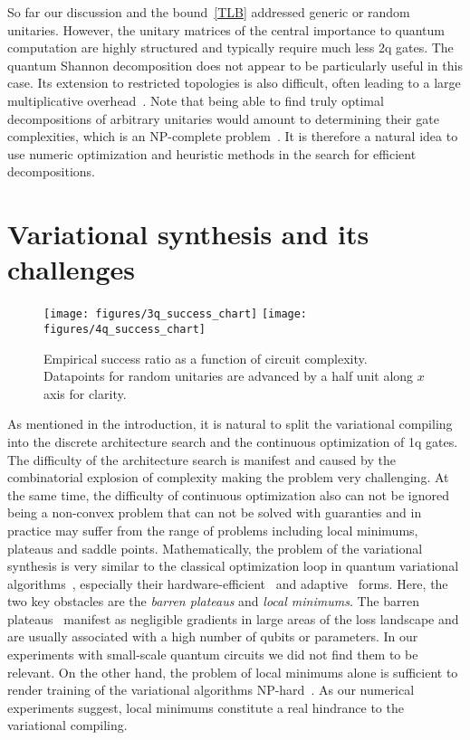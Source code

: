 \documentclass[draft, twocolumn, amsfonts, amssymb, aps, nofootinbib]{revtex4-2}
\begin{document}
So far our discussion and the bound~\eqref{TLB} addressed generic or random unitaries. However, the unitary matrices of the central importance to quantum computation are highly structured and typically require much less 2q gates. The quantum Shannon decomposition does not appear to be particularly useful in this case. Its extension to restricted topologies is also difficult, often leading to a large multiplicative overhead~\cite{Shende2006}. Note that being able to find truly optimal decompositions of arbitrary unitaries would amount to determining their gate complexities, which is an NP-complete problem~\cite{Botea2018}. It is therefore a natural idea to use numeric optimization and heuristic methods in the search for efficient decompositions.

\section{Variational synthesis and its challenges \label{sec local minimums}}

\begin{figure*}
	\texttt{[image: figures/3q\_success\_chart]}
	\texttt{[image: figures/4q\_success\_chart]}
	\caption{Empirical success ratio as a function of circuit complexity. Datapoints for random unitaries are advanced by a half unit along $x$ axis for clarity.}
	\label{fig local minimums}
\end{figure*}


As mentioned in the introduction, it is natural to split the variational compiling into the discrete architecture search and the continuous optimization of 1q gates. The difficulty of the architecture search is manifest and caused by the combinatorial explosion of complexity making the problem very challenging. At the same time, the difficulty of continuous optimization also can not be ignored being a non-convex problem that can not be solved with guaranties and in practice may suffer from the range of problems including local minimums, plateaus and saddle points. Mathematically, the problem of the variational synthesis is very similar to the classical optimization loop in quantum variational algorithms~\cite{McClean2016}, especially their hardware-efficient~\cite{Kandala2017} and adaptive~\cite{Tang2021} forms. Here, the two key obstacles are the \textit{barren plateaus} and \textit{local minimums}. The barren plateaus~\cite{McClean2018} manifest as negligible gradients in large areas of the loss landscape and are usually associated with a high number of qubits or parameters. In our experiments with small-scale quantum circuits we did not find them to be relevant. On the other hand, the problem of local minimums alone is sufficient to render training of the variational algorithms NP-hard~\cite{Bittel2021}. As our numerical experiments suggest, local minimums constitute a real hindrance to the variational compiling.
\end{document}
